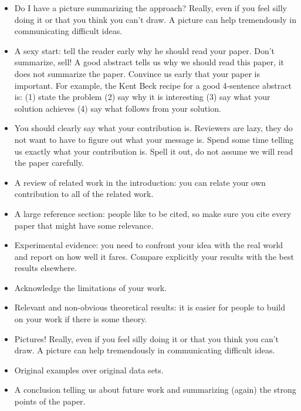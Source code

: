 \begin{itemize}
\item Do I have a picture summarizing the approach? Really, even if you feel silly doing it or that you think you can’t draw. A picture can help tremendously in communicating difficult ideas.
\item A sexy start: tell the reader early why he should read your paper. Don’t summarize, sell! A good abstract tells us why we should read this paper, it does not summarize the paper. Convince us early that your paper is important. For example, the Kent Beck recipe for a good 4-sentence abstract is: (1) state the problem (2) say why it is interesting (3) say what your solution achieves (4) say what follows from your solution.
\item You should clearly say what your contribution is. Reviewers are lazy, they do not want to have to figure out what your message is. Spend some time telling us exactly what your contribution is. Spell it out, do not assume we will read the paper carefully.
\item A review of related work in the introduction: you can relate your own contribution to all of the related work.
\item A large reference section: people like to be cited, so make sure you cite every paper that might have some relevance.
\item Experimental evidence: you need to confront your idea with the real world and report on how well it fares. Compare explicitly your results with the best results elsewhere.
\item Acknowledge the limitations of your work.
\item Relevant and non-obvious theoretical results: it is easier for people to build on your work if there is some theory.
\item Pictures! Really, even if you feel silly doing it or that you think you can’t draw. A picture can help tremendously in communicating difficult ideas.
\item Original examples over original data sets.
\item A conclusion telling us about future work and summarizing (again) the strong points of the paper.

\end{itemize}

